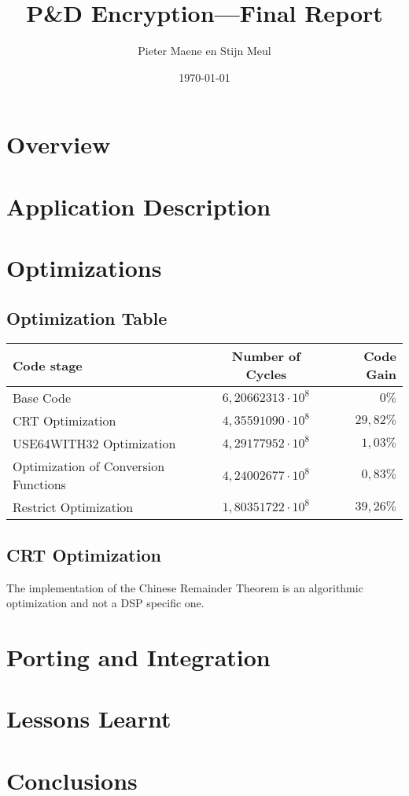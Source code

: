 \documentclass[a4paper]{article}
\title{P\&D Encryption---Final Report}
\author{Pieter Maene en Stijn Meul}
\date{\today}
\begin{document}
\maketitle

\section{Overview}

\section{Application Description}

\section{Optimizations}
\subsection{Optimization Table}
\begin{center}
	\begin{tabular}{| l | c | r |}
		\hline
		Code stage 								& Number of Cycles 				& Code Gain \\ \hline
		Base Code 								& $6,20662313 \cdot 10^{8}$ 	& $0\%$ 	\\
		CRT Optimization 						& $4,35591090 \cdot 10^{8}$		& $29,82\%$ \\
		USE64WITH32 Optimization 				& $4,29177952 \cdot 10^{8}$		& $1,03\%$	\\
		Optimization of Conversion Functions	& $4,24002677 \cdot 10^{8}$		& $0,83\%$	\\
		Restrict Optimization					& $1,80351722 \cdot 10^{8}$		& $39,26\%$ \\
		\hline
	\end{tabular}
\end{center}
\subsection{CRT Optimization}
The implementation of the Chinese Remainder Theorem is an algorithmic optimization and not a DSP specific one. 
\section{Porting and Integration}

\section{Lessons Learnt}

\section{Conclusions}
\end{document}
